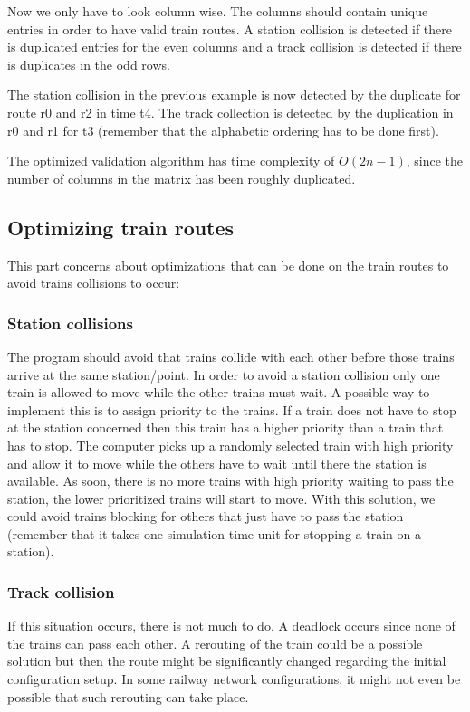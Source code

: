 \documentclass[10pt,a4paper]{article}
\begin{document}
Now we only have to look column wise. The columns should contain unique entries in order to have valid train routes.
A station collision is detected if there is duplicated entries for the even columns and a track collision is detected if there is duplicates in the odd rows.
 
The station collision in the previous example is now detected by the duplicate for route r0 and r2 in time t4.
The track collection is detected by the duplication in r0 and r1 for t3 (remember that the alphabetic ordering has to be done first).
 
The optimized validation algorithm has time complexity of $O(2n-1)$, since the number of columns in the matrix has been roughly duplicated.

\subsection{Optimizing train routes}
 
This part concerns about optimizations that can be done on the train routes to avoid trains collisions to occur:
 
\subsubsection{Station collisions}
 
The program should avoid that trains collide with each other before those trains arrive at the same station/point. In order to avoid a station collision only one train is allowed to move while the other trains must wait. A possible way to implement this is to assign priority to the trains. If a train does not have to stop at the station concerned then this train has a higher priority than a train that has to stop. The computer picks up a randomly selected train with high priority and allow it to move while the others have to wait until there the station is available. As soon, there is no more trains with high priority waiting to pass the station, the lower prioritized trains will start to move.
With this solution, we could avoid trains blocking for others that just have to pass the station (remember that it takes one simulation time unit for stopping a train on a station).
 
\subsubsection{Track collision}
 
If this situation occurs, there is not much to do. A deadlock occurs since none of the trains can pass each other.
A rerouting of the train could be a possible solution but then the route might be significantly changed regarding the initial configuration setup. In some railway network configurations, it might not even be possible that such rerouting can take place.
 
\end{document}
